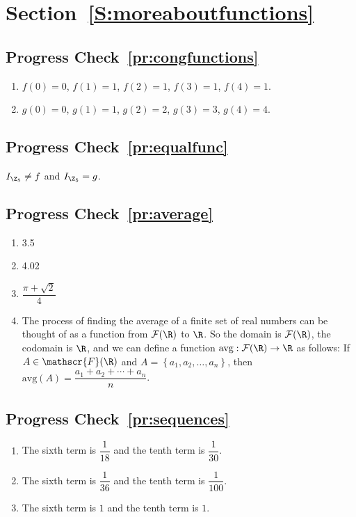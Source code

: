 \section*{Section~\ref{S:moreaboutfunctions}}

\subsection*{Progress Check~\ref{pr:congfunctions}}
\begin{enumerate}
\item $f(0) = 0$, $f(1) = 1$, $f(2) = 1$, $f(3) = 1$, $f(4) = 1$.
\item $g(0) = 0$, $g(1) = 1$, $g(2) = 2$, $g(3) = 3$, $g(4) = 4$.
\end{enumerate}

\subsection*{Progress Check~\ref{pr:equalfunc}}
$I_{\Z_5} \ne f$ and $I_{\Z_5} = g$.


\subsection*{Progress Check~\ref{pr:average}}
\begin{multicols}{3}
\begin{enumerate}
\item 3.5
\item 4.02
\item $\dfrac{\pi + \sqrt{2}}{4}$
\end{enumerate}
\end{multicols}

\begin{enumerate} \setcounter{enumi}{3}
\item The process of finding the average of a finite set of real numbers can be thought of as a function from $\mathcal{F} ( \R )$ to $\R$.  So the domain is 
$\mathcal{F} ( \R )$, the codomain is $\R$, and we can define a function 
$\text{avg}: \mathcal{F} ( \R ) \to \R$ as follows:  If 
$A \in \mathscr{F} ( \R )$ and $A = \left\{ a_1, a_2, \ldots, a_n \right\}$, then 
$\text{avg} ( A ) = \dfrac{a_1 + a_2 + \cdots + a_n}{n}$.
\end{enumerate}


\subsection*{Progress Check~\ref{pr:sequences}}
\begin{enumerate}
\item The sixth term is $\dfrac{1}{18}$ and the tenth term is $\dfrac{1}{30}$.
\item The sixth term is $\dfrac{1}{36}$ and the tenth term is $\dfrac{1}{100}$.
\item The sixth term is $1$ and the tenth term is $1$.
\end{enumerate}



